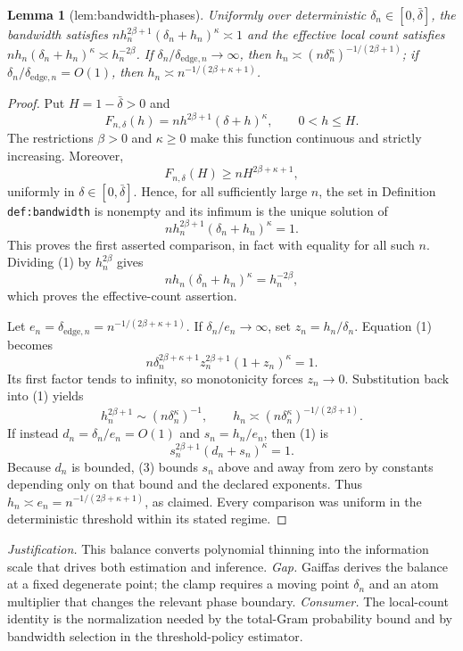 \documentclass{article}
\newtheorem{lemma}{Lemma}
\begin{document}
\begin{lemma}[lem:bandwidth-phases]\label{lem:bandwidth-phases}
Uniformly over deterministic \(\delta_n\in[0,\bar\delta]\), the bandwidth satisfies \(n h_n^{2\beta+1}(\delta_n+h_n)^\kappa\asymp1\) and the effective local count satisfies \(n h_n(\delta_n+h_n)^\kappa\asymp h_n^{-2\beta}\). If \(\delta_n/\delta_{\mathrm{edge},n}\to\infty\), then \(h_n\asymp(n\delta_n^\kappa)^{-1/(2\beta+1)}\); if \(\delta_n/\delta_{\mathrm{edge},n}=O(1)\), then \(h_n\asymp n^{-1/(2\beta+\kappa+1)}\).
\end{lemma}
\begin{proof}
Put \(H=1-\bar\delta>0\) and
\[
 F_{n,\delta}(h)=n h^{2\beta+1}(\delta+h)^\kappa,
 \qquad 0<h\leq H.
\]
The restrictions \(\beta>0\) and \(\kappa\geq0\) make this function continuous and strictly increasing.  Moreover,
\[
 F_{n,\delta}(H)\geq nH^{2\beta+\kappa+1},
\]
uniformly in \(\delta\in[0,\bar\delta]\).  Hence, for all sufficiently large \(n\), the set in Definition \texttt{def:bandwidth} is nonempty and its infimum is the unique solution of
\[
 n h_n^{2\beta+1}(\delta_n+h_n)^\kappa=1. \tag{1}
\]
This proves the first asserted comparison, in fact with equality for all such \(n\).  Dividing (1) by \(h_n^{2\beta}\) gives
\[
 n h_n(\delta_n+h_n)^\kappa=h_n^{-2\beta}, \tag{2}
\]
which proves the effective-count assertion.

Let \(e_n=\delta_{\mathrm{edge},n}=n^{-1/(2\beta+\kappa+1)}\).  If \(\delta_n/e_n\to\infty\), set \(z_n=h_n/\delta_n\).  Equation (1) becomes
\[
 n\delta_n^{2\beta+\kappa+1}z_n^{2\beta+1}(1+z_n)^\kappa=1.
\]
Its first factor tends to infinity, so monotonicity forces \(z_n\to0\).  Substitution back into (1) yields
\[
 h_n^{2\beta+1}\sim(n\delta_n^\kappa)^{-1},
 \qquad
 h_n\asymp(n\delta_n^\kappa)^{-1/(2\beta+1)}.
\]
If instead \(d_n=\delta_n/e_n=O(1)\) and \(s_n=h_n/e_n\), then (1) is
\[
 s_n^{2\beta+1}(d_n+s_n)^\kappa=1. \tag{3}
\]
Because \(d_n\) is bounded, (3) bounds \(s_n\) above and away from zero by constants depending only on that bound and the declared exponents.  Thus \(h_n\asymp e_n=n^{-1/(2\beta+\kappa+1)}\), as claimed.  Every comparison was uniform in the deterministic threshold within its stated regime.
\end{proof}
\par\smallskip\noindent \textit{Justification.} This balance converts polynomial thinning into the information scale that drives both estimation and inference. \textit{Gap.} Gaiffas derives the balance at a fixed degenerate point; the clamp requires a moving point \(\delta_n\) and an atom multiplier that changes the relevant phase boundary. \textit{Consumer.} The local-count identity is the normalization needed by the total-Gram probability bound and by bandwidth selection in the threshold-policy estimator.
\end{document}

